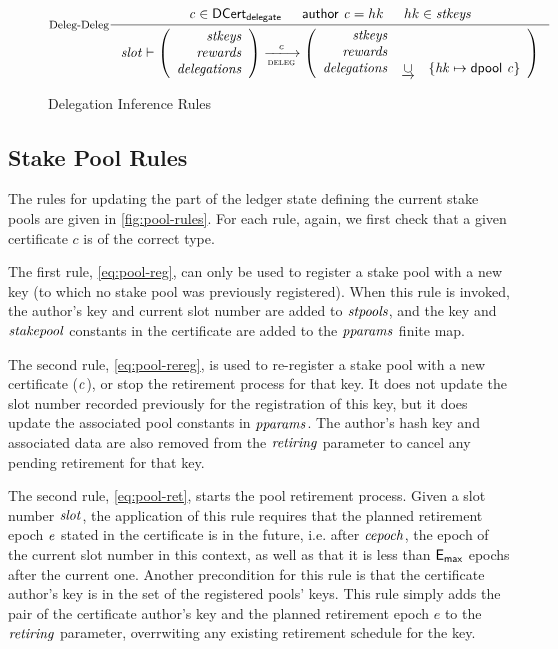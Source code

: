 \begin{figure}
  \begin{equation}\label{eq:deleg-deleg}
    \inference[Deleg-Deleg]
    {
      \var{c}\in \DCertDeleg & \cauthor{c} = hk & hk \in \var{stkeys}
    }
    {
      \var{slot} \vdash
      \left(
      \begin{array}{r}
        \var{stkeys} \\
        \var{rewards} \\
        \var{delegations}
      \end{array}
      \right)
      \trans{deleg}{c}
      \left(
      \begin{array}{rcl}
        \var{stkeys} \\
        \var{rewards} \\
        \var{delegations} & \unionoverrideRight & \{\var{hk} \mapsto \dpool c\}
      \end{array}
      \right)
    }
  \end{equation}
  \caption{Delegation Inference Rules}
  \label{fig:delegation-rules}
\end{figure}



\subsection{Stake Pool Rules}
\label{sec:pool-rules}


The rules for updating the part of the ledger state defining the current stake
pools are given in \cref{fig:pool-rules}.
For each rule, again, we first check that a given certificate $c$ is of
the correct type.

The first rule, \cref{eq:pool-reg}, can only be used to register a stake pool
with a new key (to which no stake pool was previously registered).
When this rule is invoked,
 the author's key and current slot number are added to $\mathit{stpools}$, and the
key and $\mathit{stakepool}$ constants in the certificate are added to the $\mathit{pparams}$
finite map.

The second rule, \cref{eq:pool-rereg}, is used to re-register a
stake pool with a new certificate ($\mathit{c}$), or stop the retirement
process for that key. It does not update the slot number recorded previously
for the registration of this key, but it does update the associated pool constants
in $\mathit{pparams}$. The author's hash key and associated data
are also removed from the $\mathit{retiring}$ parameter to cancel any pending
retirement for that key.

The second rule, \cref{eq:pool-ret}, starts the pool retirement process. Given a
slot number $\mathit{slot}$, the application of this rule requires that the
planned retirement epoch $\mathit{e}$ stated in the certificate is in the future,
i.e. after
$\mathit{cepoch}$, the epoch of the current slot number in this context, as well as
that it is
less than $\mathsf{E_{max}}$ epochs after the current one. Another precondition for this
rule is that
the certificate author's key is in the set of the registered pools' keys.
This rule simply adds the pair of the
certificate author's key and the planned retirement epoch $e$ to the $\mathit{retiring}$
parameter, overrwiting any existing retirement schedule for the key.

